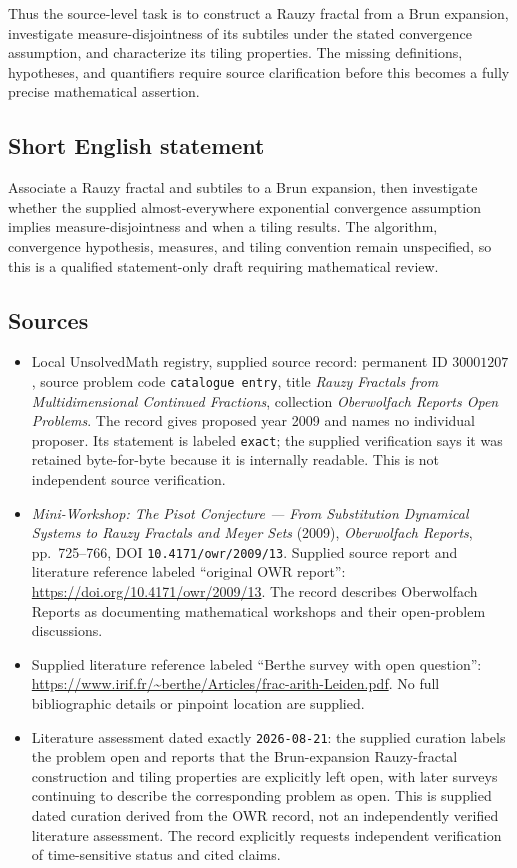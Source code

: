 \documentclass[11pt]{article}
\begin{document}
Thus the source-level task is to construct a Rauzy fractal from a Brun expansion, investigate measure-disjointness of its subtiles under the stated convergence assumption, and characterize its tiling properties. The missing definitions, hypotheses, and quantifiers require source clarification before this becomes a fully precise mathematical assertion.
\subsection{Short English statement}
Associate a Rauzy fractal and subtiles to a Brun expansion, then investigate whether the supplied almost-everywhere exponential convergence assumption implies measure-disjointness and when a tiling results. The algorithm, convergence hypothesis, measures, and tiling convention remain unspecified, so this is a qualified statement-only draft requiring mathematical review.
\subsection{Sources}
\begin{itemize}
\item Local UnsolvedMath registry, supplied source record: permanent ID \(30001207\), source problem code \texttt{catalogue entry}, title \emph{Rauzy Fractals from Multidimensional Continued Fractions}, collection \emph{Oberwolfach Reports Open Problems}. The record gives proposed year 2009 and names no individual proposer. Its statement is labeled \texttt{exact}; the supplied verification says it was retained byte-for-byte because it is internally readable. This is not independent source verification.
\item \emph{Mini-Workshop: The Pisot Conjecture --- From Substitution Dynamical Systems to Rauzy Fractals and Meyer Sets} (2009), \emph{Oberwolfach Reports}, pp.\ 725--766, DOI \texttt{10.4171/owr/2009/13}. Supplied source report and literature reference labeled ``original OWR report'': \url{https://doi.org/10.4171/owr/2009/13}. The record describes Oberwolfach Reports as documenting mathematical workshops and their open-problem discussions.
\item Supplied literature reference labeled ``Berthe survey with open question'': \url{https://www.irif.fr/~berthe/Articles/frac-arith-Leiden.pdf}. No full bibliographic details or pinpoint location are supplied.
\item Literature assessment dated exactly \texttt{2026-08-21}: the supplied curation labels the problem open and reports that the Brun-expansion Rauzy-fractal construction and tiling properties are explicitly left open, with later surveys continuing to describe the corresponding problem as open. This is supplied dated curation derived from the OWR record, not an independently verified literature assessment. The record explicitly requests independent verification of time-sensitive status and cited claims.
\end{itemize}
\end{document}
